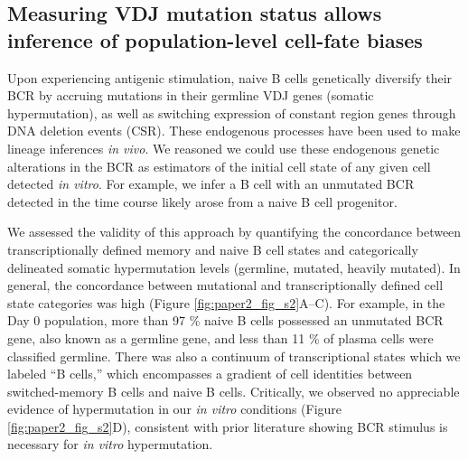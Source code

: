 \subsection{Measuring VDJ mutation status allows inference of population-level cell-fate biases}

Upon experiencing antigenic stimulation, naive B cells genetically diversify their BCR by accruing mutations in their germline VDJ genes (somatic hypermutation), as well as switching expression of constant region genes through DNA deletion events (CSR). These endogenous processes have been used to make lineage inferences \textit{in vivo}\cite{horns_lineage_2016}. We reasoned we could use these endogenous genetic alterations in the BCR as estimators of the initial cell state of any given cell detected \textit{in vitro}. For example, we infer a B cell with an unmutated BCR detected in the time course likely arose from a naive B cell progenitor.

We assessed the validity of this approach by quantifying the concordance between transcriptionally defined memory and naive B cell states and categorically delineated somatic hypermutation levels (germline, mutated, heavily mutated). In general, the concordance between mutational and transcriptionally defined cell state categories was high (Figure \ref{fig:paper2_fig_s2}A–C). For example, in the Day 0 population, more than 97 \% naive B cells possessed an unmutated BCR gene, also known as a germline gene, and less than 11 \% of plasma cells were classified germline. There was also a continuum of transcriptional states which we labeled “B cells,” which encompasses a gradient of cell identities between switched-memory B cells and naive B cells. Critically, we observed no appreciable evidence of hypermutation in our \textit{in vitro} conditions (Figure \ref{fig:paper2_fig_s2}D), consistent with prior literature showing BCR stimulus is necessary for \textit{in vitro} hypermutation\cite{bergthorsdottir_signals_2001}.

